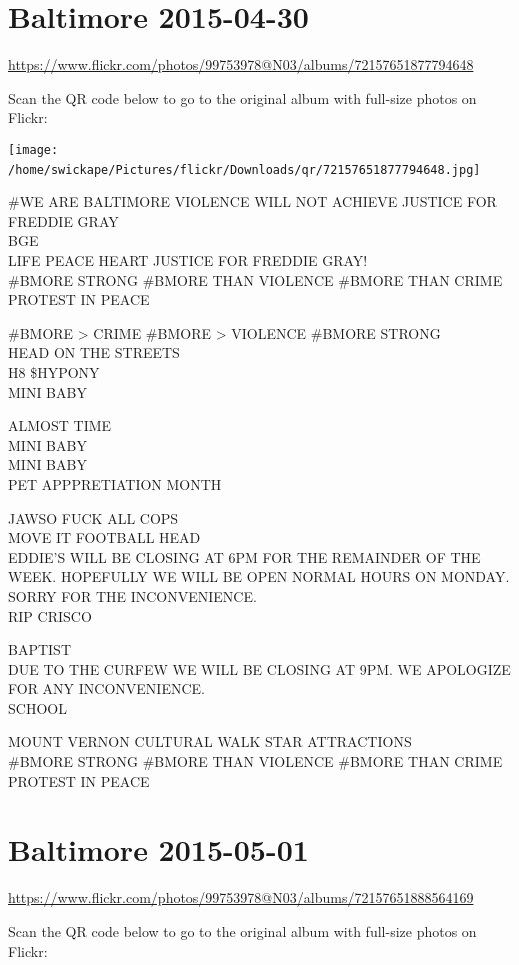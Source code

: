 \documentclass[10pt,letterpaper]{article}
\begin{document}
\section*{Baltimore 2015-04-30}

\url{https://www.flickr.com/photos/99753978@N03/albums/72157651877794648}

Scan the QR code below to go to the original album with full-size photos on Flickr:

\texttt{[image: /home/swickape/Pictures/flickr/Downloads/qr/72157651877794648.jpg]}
\

\#WE ARE BALTIMORE VIOLENCE WILL NOT ACHIEVE JUSTICE FOR FREDDIE GRAY\\
BGE\\
LIFE PEACE HEART JUSTICE FOR FREDDIE GRAY!\\
\#BMORE STRONG \#BMORE THAN VIOLENCE \#BMORE THAN CRIME PROTEST IN PEACE

\#BMORE > CRIME \#BMORE > VIOLENCE \#BMORE STRONG\\
HEAD ON THE STREETS\\
H8 \$HYPONY\\
MINI BABY

ALMOST TIME\\
MINI BABY\\
MINI BABY\\
PET APPPRETIATION MONTH

JAWSO FUCK ALL COPS\\
MOVE IT FOOTBALL HEAD\\
EDDIE'S WILL BE CLOSING AT 6PM FOR THE REMAINDER OF THE WEEK.  HOPEFULLY WE WILL BE OPEN NORMAL HOURS ON MONDAY.  SORRY FOR THE INCONVENIENCE.\\
RIP CRISCO

BAPTIST\\
DUE TO THE CURFEW WE WILL BE CLOSING AT 9PM.  WE APOLOGIZE FOR ANY INCONVENIENCE.\\
SCHOOL

MOUNT VERNON CULTURAL WALK STAR ATTRACTIONS\\
\#BMORE STRONG \#BMORE THAN VIOLENCE \#BMORE THAN CRIME PROTEST IN PEACE
\

\section*{Baltimore 2015-05-01}

\url{https://www.flickr.com/photos/99753978@N03/albums/72157651888564169}

Scan the QR code below to go to the original album with full-size photos on Flickr:
\end{document}
